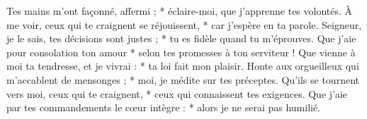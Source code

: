 Tes mains m’ont façonné, affermi ; *
éclaire-moi, que j’apprenne tes volontés.
\versseparator
À me voir, ceux qui te craignent se réjouissent, *
car j’espère en ta parole.
\versseparator
Seigneur, je le sais, tes décisions sont justes ; *
tu es fidèle quand tu m’éprouves.
\versseparator
Que j’aie pour consolation ton amour *
selon tes promesses à ton serviteur !
\versseparator
Que vienne à moi ta tendresse, et je vivrai : *
ta loi fait mon plaisir.
\versseparator
Honte aux orgueilleux qui m’accablent de mensonges ; *
moi, je médite sur tes préceptes.
\versseparator
Qu’ils se tournent vers moi, ceux qui te craignent, *
ceux qui connaissent tes exigences.
\versseparator
Que j’aie par tes commandements le cœur intègre : *
alors je ne serai pas humilié.
